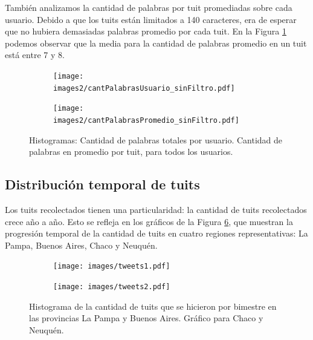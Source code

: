 También analizamos la cantidad de palabras por tuit promediadas sobre cada usuario.
Debido a que los tuits están limitados a 140 caracteres, era de esperar que no hubiera demasiadas palabras promedio por cada tuit. En la Figura \ref{fig:cantPalabrasUsuario} podemos observar que la media para la cantidad de palabras promedio en un tuit está entre 7 y 8.
\begin{figure}[!ht]\centering
  \begin{subfigure}[t]{0.49\textwidth}
    \texttt{[image: images2/cantPalabrasUsuario\_sinFiltro.pdf]}
    \caption{} 
    \label{fig:cantPalabrasUsuario} 
   \end{subfigure}
   \begin{subfigure}[t]{0.49\textwidth}
    \texttt{[image: images2/cantPalabrasPromedio\_sinFiltro.pdf]}
    \caption{} 
    \label{fig:cantPalabrasPromedio} 
   \end{subfigure}
   \caption{ Histogramas:  Cantidad de palabras totales por usuario.  Cantidad de palabras en promedio por tuit, para todos los usuarios.}
\end{figure}

\subsection{Distribución temporal de tuits}
Los tuits recolectados tienen una particularidad: la cantidad de tuits recolectados crece año a año. Esto se refleja en los gráficos de la Figura \ref{fig:histTweets}, que muestran la progresión temporal de la cantidad de tuits en cuatro regiones representativas: La Pampa, Buenos Aires, Chaco y Neuquén.

\begin{figure}[!ht]\centering
   \begin{subfigure}[t]{0.49\textwidth}
     \texttt{[image: images/tweets1.pdf]}
     \caption{}
     \label{fig:histTweetsProvincia1}
   \end{subfigure}
   \begin{subfigure}[t]{0.49\textwidth}
     \texttt{[image: images/tweets2.pdf]}
     \caption{}
     \label{fig:histTweetsProvincia2}
   \end{subfigure}
   \caption {  Histograma de la cantidad de tuits que se hicieron por bimestre en las provincias La Pampa y Buenos Aires.  Gráfico para Chaco y Neuquén.}
   \label{fig:histTweets}
\end{figure}


